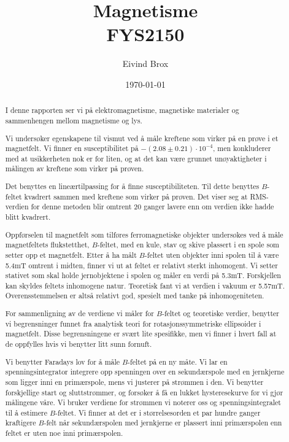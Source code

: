 \documentclass[a4paper,11pt, twocolumn]{article}
\title{Magnetisme\\ FYS2150}
\author{Eivind Brox}
\date{\today}
\begin{document}
\maketitle

\maketitle



\begin{abstract}
	I denne rapporten ser vi på elektromagnetisme, magnetiske materialer og sammenhengen mellom magnetisme og lys.

	Vi undersøker egenskapene til vismut ved å måle kreftene som virker på en prøve i et magnetfelt. Vi finner en susceptibilitet på $-(2.08\pm0.21)\cdot10^{-4}$, men konkluderer med at usikkerheten nok er for liten, og at det kan være grunnet unøyaktigheter i målingen av kreftene som virker på prøven.

	Det benyttes en lineærtilpassing for å finne susceptibiliteten. Til dette benyttes $B$-feltet kvadrert sammen med kreftene som virker på prøven. Det viser seg at RMS-verdien for denne metoden blir omtrent 20 ganger lavere enn om verdien ikke hadde blitt kvadrert.

	Oppførselen til magnetfelt som tilføres ferromagnetiske objekter undersøkes ved å måle magnetfeltets flukstetthet, $B$-feltet, med en kule, stav og skive plassert i en spole som setter opp et magnetfelt. Etter å ha målt $B$-feltet uten objekter inni spolen til å være 5.4mT omtrent i midten, finner vi ut at feltet er relativt sterkt inhomogent. Vi setter stativet som skal holde jernobjektene i spolen og måler en verdi på 5.3mT. Forskjellen kan skyldes feltets inhomogene natur. Teoretisk fant vi at verdien i vakuum er 5.57mT. Overensstemmelsen er altså relativt god, spesielt med tanke på inhomogeniteten.

	For sammenligning av de verdiene vi måler for $B$-feltet og teoretiske verdier, benytter vi begrensninger funnet fra analytisk teori for rotasjonssymmetriske ellipsoider i magnetfelt. Disse begrensningene er svært lite spesifikke, men vi finner i hvert fall at de oppfylles hvis vi benytter litt sunn fornuft. 

	Vi benytter Faradays lov for å måle $B$-feltet på en ny måte. Vi lar en spenningsintegrator integrere opp spenningen over en sekundærspole med en jernkjerne som ligger inni en primærspole, mens vi justerer på strømmen i den. Vi benytter forskjellige start og sluttstrømmer, og forsøker å få en lukket hysteresekurve før vi gjør målingene våre. Vi bruker verdiene for strømmen vi noterer oss og spenningsintegralet til å estimere $B$-feltet. Vi finner at det er i størrelsesorden et par hundre ganger kraftigere $B$-felt når sekundærspolen med jernkjerne er plassert inni primærspolen enn feltet er uten noe inni primærspolen.


\end{abstract}
\end{document}
